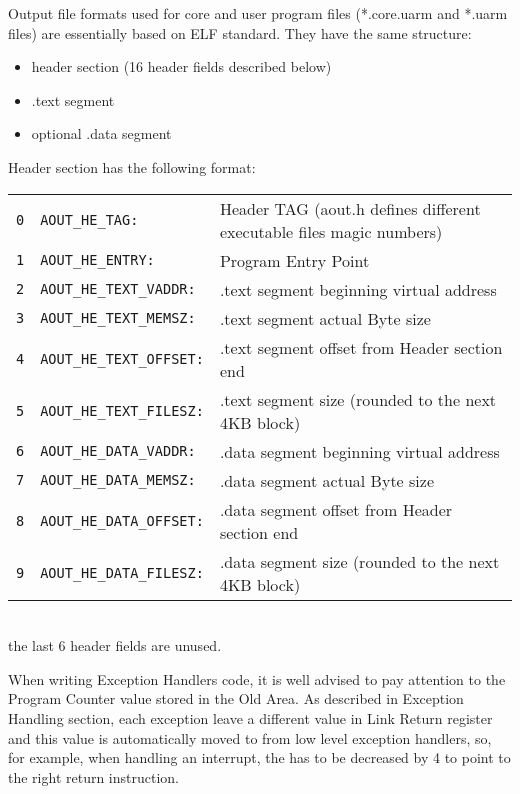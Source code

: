 
Output file formats used for core and user program files (*.core.uarm and *.uarm files) are essentially based on ELF standard. They have the same structure:
\begin{itemize}
\item header section (16 header fields described below)
\item .text segment
\item optional .data segment
\end{itemize}

Header section has the following format:
\\

\noindent
\begin{tabular}{rlp{8cm}}
\texttt{0} & \texttt{AOUT\_HE\_TAG:} & Header TAG (aout.h defines different executable files magic numbers) \\
\texttt{1} & \texttt{AOUT\_HE\_ENTRY:} & Program Entry Point \\
\texttt{2} & \texttt{AOUT\_HE\_TEXT\_VADDR:} & .text segment beginning virtual address \\
\texttt{3} & \texttt{AOUT\_HE\_TEXT\_MEMSZ:} & .text segment actual Byte size \\
\texttt{4} & \texttt{AOUT\_HE\_TEXT\_OFFSET:} & .text segment offset from Header section end \\
\texttt{5} & \texttt{AOUT\_HE\_TEXT\_FILESZ:} & .text segment size (rounded to the next 4KB block) \\
\texttt{6} & \texttt{AOUT\_HE\_DATA\_VADDR:} & .data segment beginning virtual address \\
\texttt{7} & \texttt{AOUT\_HE\_DATA\_MEMSZ:} & .data segment actual Byte size \\
\texttt{8} & \texttt{AOUT\_HE\_DATA\_OFFSET:} & .data segment offset from Header section end \\
\texttt{9} & \texttt{AOUT\_HE\_DATA\_FILESZ:} & .data segment size (rounded to the next 4KB block) \\
\end{tabular}
\\

the last 6 header fields are unused.


When writing Exception Handlers code, it is well advised to pay attention to the Program Counter value stored in the Old Area. As described in Exception Handling section, each exception leave a different value in Link Return register and this value is automatically moved to  from low level exception handlers, so, for example, when handling an interrupt, the  has to be decreased by 4 to point to the right return instruction.

